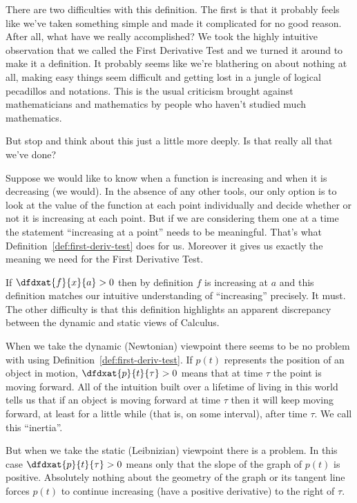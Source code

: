 \begin{Digression}
There are two difficulties with this definition. The first is that it
probably feels like we've taken something simple and made it
complicated for no good reason. After all, what have we really
accomplished? We took the highly intuitive observation that we called
the First Derivative Test and we turned it around to make it a
definition. It probably seems like we're blathering on about nothing
at all, making easy things seem difficult and getting lost in a jungle
of logical pecadillos and notations. This is the usual criticism
brought against mathematicians and mathematics by people who haven't
studied much mathematics.

But stop and think about this just a little more deeply. Is that
really all that we've done?

Suppose we would like to know when a function is increasing and when
it is decreasing (we would). In the absence of any other tools, our
only option is to look at the value of the function at each point
individually and decide whether or not it is increasing at each
point. But if we are considering them one at a time the statement
``increasing at a point'' needs to be meaningful. That's what
Definition~\ref{def:first-deriv-test} does for us. Moreover it gives us exactly the meaning we need for the First
Derivative Test. 

If $\dfdxat{f}{x}{a}>0$ then \alert{by definition} $f$ is increasing
at $a$ and this definition matches our intuitive understanding of
``increasing'' precisely. It must.
The other difficulty is that this definition highlights an apparent
discrepancy between the dynamic and static views of Calculus.

When we take the dynamic (Newtonian) viewpoint there seems to be no
problem with using Definition~\ref{def:first-deriv-test}. If $p(t)$
represents the position of an object in motion,
$\dfdxat{p}{t}{\tau}>0$  means that at time $\tau$ the point is
moving forward. All of the intuition built over a lifetime of living
in this world tells us that if an object is moving forward at time
$\tau$ then it will keep moving forward, at least for a little while
(that is, on some interval), after time $\tau$.  We call this
``inertia''.

But when we take the static (Leibnizian) viewpoint there is a
problem. In this case $\dfdxat{p}{t}{\tau}>0$ means only that the
slope of the graph of $p(t)$ is positive. Absolutely nothing about the
geometry of the graph or its tangent line forces $p(t)$ to continue
increasing (have a positive derivative) to the right of $\tau$.


\end{Digression}
